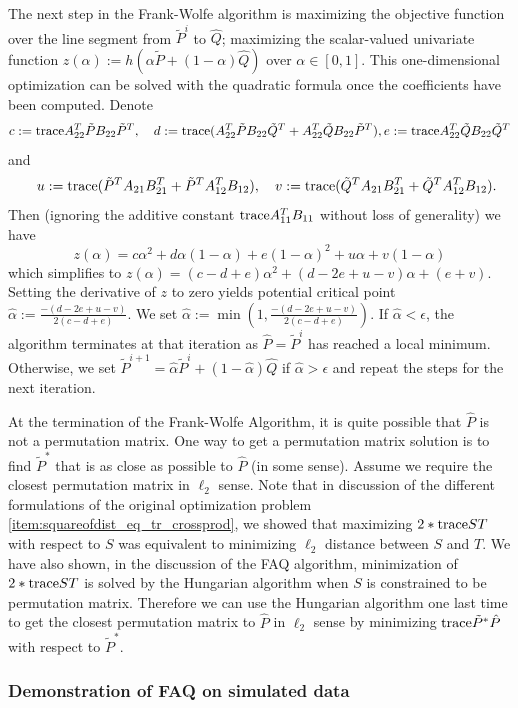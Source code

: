\documentclass[12pt,oneside,final]{thesis}
\begin{document}
The next step in the Frank-Wolfe algorithm 
is maximizing the objective function over the line
segment from $\tilde{P}^{i}$ to $\hat{Q}$;  \ie maximizing the scalar-valued univariate function $z(\alpha):=h(\alpha \tilde{P}
+(1-\alpha ) \hat{Q})$ over $\alpha \in [0,1]$. This one-dimensional optimization can be solved with the quadratic formula once the coefficients have been computed. Denote
$$c:=\tr A^T_{22} \tilde{P} B_{22} \tilde{P}^T,\quad d:=\tr (A^T_{22} \tilde{P} B_{22} \tilde{Q}^T +
    A^T_{22} \tilde{Q} B_{22} \tilde{P}^T), \onespace e:=\tr A^T_{22} \tilde{Q} B_{22} \tilde{Q}^T$$ and
$$\quad u:=\textup{trace} ( \tilde{P}^TA_{21}B_{21}^T   + \tilde{P}^TA_{12}^TB_{12} ), \quad v:=\textup{trace} ( \tilde{Q}^TA_{21}B_{21}^T   + \tilde{Q}^TA_{12}^TB_{12} ).$$ Then
(ignoring the additive constant $\textup{trace} A_{11}^TB_{11}$ without loss of
generality)
we have $$z(\alpha)=c \alpha^2+d \alpha (1-\alpha)
+e(1-\alpha)^2+u \alpha + v(1-\alpha)$$  which simplifies to
$z(\alpha)=(c-d+e)\alpha^2+(d-2e+u-v)\alpha + (e+v)$. Setting the
derivative of $z$ to zero yields potential critical point
$\hat{\alpha}:=\frac{-(d-2e+u-v)}{2(c-d+e)}$. We set $\hat{\alpha}:=\min(1,\frac{-(d-2e+u-v)}{2(c-d+e)})$.
If $\hat{\alpha}<\epsilon$, the algorithm terminates at that iteration as  $\hat{P}=\tilde{P}^{i}$  has reached a local minimum. Otherwise, we set $\tilde{P}^{i+1}= \hat{\alpha} \tilde{P}^{i}
+(1- \hat{\alpha} ) \hat{Q}$ if $\hat{\alpha}>\epsilon$   and repeat the steps for the next iteration.

At the termination of the Frank-Wolfe Algorithm, it is quite possible that   $\hat{P}$ is not a permutation matrix. One way to get a permutation matrix solution is to find  ${\tilde{P}}^{*}$ that is as close as possible to  $\hat{P}$ (in some sense). Assume we require the closest permutation matrix in $\ell_2$ sense. Note that in discussion of the different formulations of the  original optimization problem \ref{item:squareofdist_eq_tr_crossprod}, we showed that maximizing $2*\textup{trace} {ST}$ with respect to $S$ was equivalent to minimizing $\ell_2$ distance between $S$ and $T$. We have also shown, in the discussion of the FAQ algorithm, minimization of  $2*\textup{trace} {ST}$ is solved by the Hungarian algorithm when $S$ is constrained to be permutation matrix. Therefore we can use the Hungarian algorithm one last time to get  the closest permutation matrix to  $\hat{P}$ in $\ell_2$ sense by minimizing $\textup{trace} {\tilde{P}}^{*}\hat{P}$ with respect to ${\tilde{P}}^{*}$.

\subsubsection{Demonstration of FAQ on simulated data\label{subsubsec:sgm_sim_results}}
\end{document}
